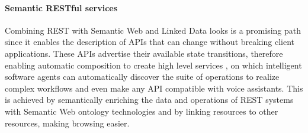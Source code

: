 

\paragraph{Semantic RESTful services}
Combining REST with Semantic Web and Linked Data looks is a promising path since  it enables the description of APIs that can change without breaking client applications. These APIs advertise their available state transitions, therefore enabling automatic composition to create high level services \cite{alarcon2015rest}, on which intelligent software agents can automatically discover the suite of operations to realize complex workflows and even make any API compatible with voice assistants. This is achieved by semantically enriching the data and operations of REST systems with Semantic Web ontology technologies and by linking resources to other resources, making browsing easier.



